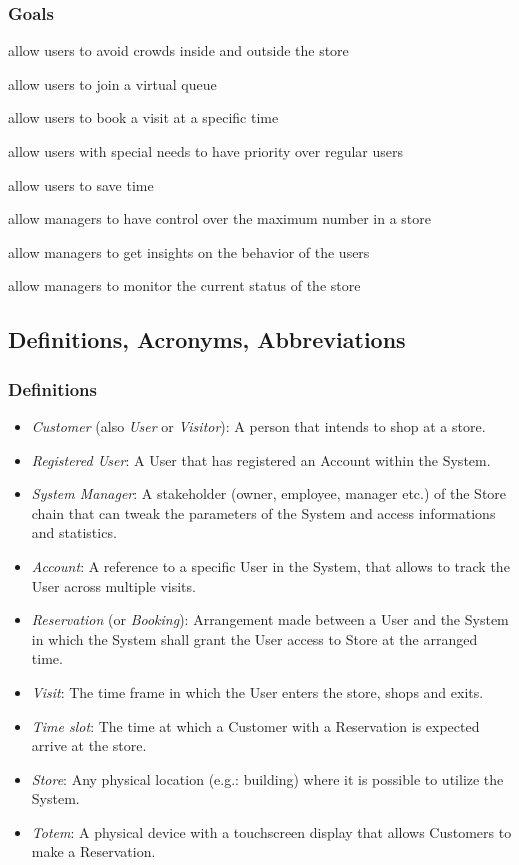\subsubsection{Goals}
\begin{enumerate}[label={[G\arabic*]}]
    \item allow users to avoid crowds inside and outside the store
    \begin{enumerate}[label={[G1.\arabic*]}]
        \item allow users to join a virtual queue
        \item allow users to book a visit at a specific time
    \end{enumerate}
    \item allow users with special needs to have priority over regular users
    \item allow users to save time
    \item allow managers to have control over the maximum number in a store
    \item allow managers to get insights on the behavior of the users
    \item allow managers to monitor the current status of the store
\end{enumerate}

\subsection{Definitions, Acronyms, Abbreviations}

\subsubsection{Definitions}
\begin{itemize}
    \item \emph{Customer} (also \emph{User} or \emph{Visitor}): A person that intends to shop at a store.
    \item \emph{Registered User}: A User that has registered an Account within the System.
    \item \emph{System Manager}: A stakeholder (owner, employee, manager etc.) of the Store chain that can tweak the parameters of the System and access informations and statistics.
    \item \emph{Account}: A reference to a specific User in the System, that allows to track the User across multiple visits.
    \item \emph{Reservation} (or \emph{Booking}): Arrangement made between a User and the System in which the System shall grant the User access to Store at the arranged time.
    \item \emph{Visit}: The time frame in which the User enters the store, shops and exits.
    \item \emph{Time slot}: The time at which a Customer with a Reservation is expected arrive at the store.
    \item \emph{Store}: Any physical location (e.g.: building) where it is possible to utilize the System.
    \item \emph{Totem}: A physical device with a touchscreen display that allows Customers to make a Reservation.
\end{itemize}

